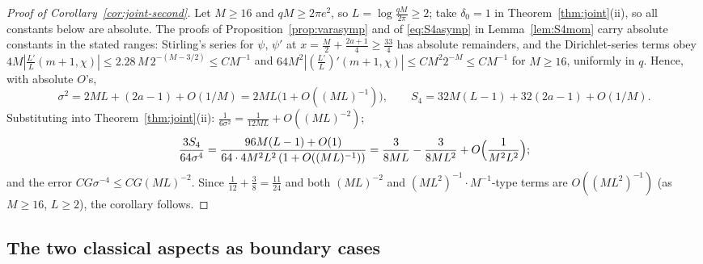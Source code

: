 \documentclass[11pt]{article}
\begin{document}
\begin{proof}[Proof of Corollary~\ref{cor:joint-second}]
Let $M\ge16$ and $qM\ge2\pi e^2$, so $L=\log\tfrac{qM}{2\pi}\ge2$; take
$\delta_0=1$ in Theorem~\ref{thm:joint}(ii), so all constants below
are absolute. The proofs of Proposition~\ref{prop:varasymp} and of
\eqref{eq:S4asymp} in Lemma~\ref{lem:S4mom} carry absolute constants
in the stated ranges: Stirling's series for $\psi$, $\psi'$ at
$x=\tfrac M2+\tfrac{2a+1}4\ge\tfrac{33}4$ has absolute remainders, and
the Dirichlet-series terms obey
$4M|\tfrac{L'}L(m+1,\chi)|\le2.28\,M\,2^{-(M-3/2)}\le CM^{-1}$ and
$64M^2|(\tfrac{L'}L)'(m+1,\chi)|\le CM^{2}2^{-M}\le CM^{-1}$ for
$M\ge16$, uniformly in $q$. Hence, with absolute $O$'s,
\[
\sigma^2=2ML+(2a-1)+O(1/M)=2ML\bigl(1+O((ML)^{-1})\bigr),
\qquad
S_4=32M(L-1)+32(2a-1)+O(1/M).
\]
Substituting into Theorem~\ref{thm:joint}(ii):
$\tfrac1{6\sigma^2}=\tfrac1{12ML}+O((ML)^{-2})$;
\[
\frac{3S_4}{64\sigma^4}
=\frac{96M(L-1)+O(1)}{64\cdot4M^2L^2\,(1+O((ML)^{-1}))}
=\frac{3}{8ML}-\frac{3}{8ML^2}+O\Bigl(\frac1{M^2L^2}\Bigr);
\]
and the error $CG\sigma^{-4}\le CG(ML)^{-2}$. Since
$\tfrac1{12}+\tfrac38=\tfrac{11}{24}$ and both $(ML)^{-2}$ and
$(ML^2)^{-1}\cdot M^{-1}$-type terms are $O((ML^2)^{-1})$ (as
$M\ge16$, $L\ge2$), the corollary follows.
\end{proof}

\subsection*{The two classical aspects as boundary cases}
\end{document}
